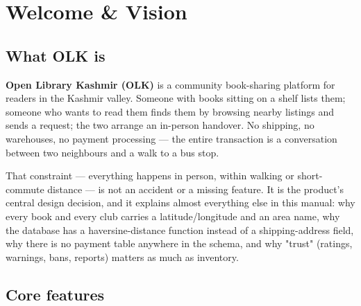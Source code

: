 \chapter{Welcome \& Vision}
\label{ch:welcome}

\section{What OLK is}

\textbf{Open Library Kashmir (OLK)} is a community book-sharing platform for readers in the Kashmir valley. Someone with books sitting on a shelf lists them; someone who wants to read them finds them by browsing nearby listings and sends a request; the two arrange an in-person handover. No shipping, no warehouses, no payment processing — the entire transaction is a conversation between two neighbours and a walk to a bus stop.

That constraint — everything happens in person, within walking or short-commute distance — is not an accident or a missing feature. It is the product's central design decision, and it explains almost everything else in this manual: why every book and every club carries a latitude/longitude and an area name, why the database has a haversine-distance function instead of a shipping-address field, why there is no payment table anywhere in the schema, and why "trust" (ratings, warnings, bans, reports) matters as much as inventory.

\section{Core features}

